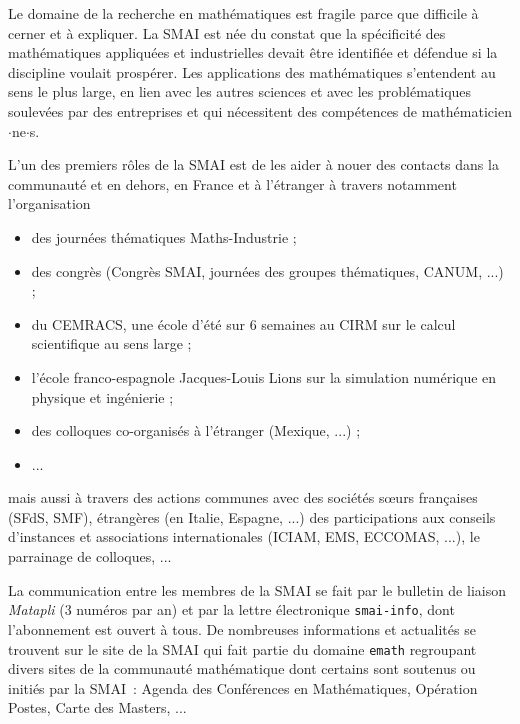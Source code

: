 Le domaine de la recherche en math\'ematiques est fragile parce que difficile \`a
cerner et \`a expliquer. La SMAI est n\'ee du constat
que la sp\'ecificit\'e des math\'ematiques appliqu\'ees et industrielles devait \^etre
identifi\'ee et d\'efendue si la discipline voulait prosp\'erer. Les
applications des math\'ematiques s'entendent au sens le plus large,
en lien avec les autres sciences et avec les probl\'ematiques
soulev\'ees par des entreprises et qui n\'ecessitent des comp\'etences de math\'ematicien$\cdot$ne$\cdot$s.

L'un des premiers r\^oles de la SMAI est de les aider \`a nouer des contacts dans la communaut\'e
et en dehors, en France et \`a l'\'etranger \`a travers notamment
l'organisation
\begin{itemize}%
    \item des journ\'ees th\'ematiques Maths-Industrie ;
    \item des congr\`es (Congr\`es SMAI, journ\'ees des groupes th\'ematiques, CANUM, ...) ;
    \item du CEMRACS, une \'ecole d'\'et\'e sur 6 semaines au CIRM sur le calcul scientifique
	au sens large ;
    \item l'\'ecole franco-espagnole Jacques-Louis Lions sur la simulation num\'erique en
	physique et ing\'enierie ;
    \item des colloques co-organis\'es \`a l'\'etranger (Mexique, ...) ;
    \item ...
\end{itemize}
mais aussi \`a travers des actions communes avec des soci\'et\'es
s\oe urs fran\c caises (SFdS, SMF), \'etrang\`eres (en Italie, Espagne, ...)
des participations aux conseils d'instances et associations internationales (ICIAM,
EMS, ECCOMAS, ...), le parrainage de colloques, ...

La communication entre les membres de la SMAI se fait par le bulletin de
liaison \emph{Matapli} (3 num\'eros par an) et par la lettre \'electronique
\texttt{smai-info}, dont l'abonnement est ouvert \`a tous. De nombreuses
informations et actualit\'es se trouvent sur le site de la SMAI qui fait partie
du domaine \texttt{emath} regroupant divers sites de la communaut\'e
math\'ematique dont certains sont soutenus ou initi\'es par la SMAI~:
Agenda des Conf\'erences en Math\'ematiques, Op\'eration Postes, Carte des Masters, ...

